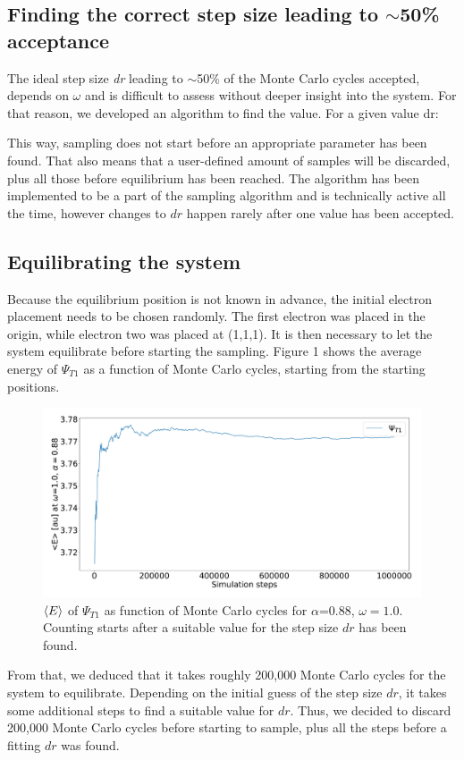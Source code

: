 \documentclass[10pt,a4paper]{article}
\begin{document}
\subsection{Finding the correct step size leading to $\sim$50\% acceptance}
The ideal step size \textit{dr} leading to $\sim$50\% of the Monte Carlo cycles accepted, depends on $\omega$ and is difficult to assess without deeper insight into the system. For that reason, we developed an algorithm to find the value. For a given value dr:\\
\IncMargin{1em}
\begin{algorithm}[H]  
\end{algorithm}
\DecMargin{1em}
This way, sampling does not start before an appropriate parameter has been found. That also means that a user-defined amount of samples will be discarded, plus all those before equilibrium has been reached. The algorithm has been implemented to be a part of the sampling algorithm and is technically active all the time, however changes to $dr$ happen rarely after one value has been accepted. 
\subsection{Equilibrating the system}
Because the equilibrium position is not known in advance, the initial electron placement needs to be chosen randomly. The first electron was placed in the origin, while electron two was placed at (1,1,1). It is then necessary to let the system equilibrate before starting the sampling. Figure 1 shows the average energy of $\Psi_{T1}$ as a function of Monte Carlo cycles, starting from the starting positions.
\begin{figure}[H]
\centering
\includegraphics[width=\textwidth]{Energy_variation.pdf}
\caption[<E> as function of Monte Carlo cycles]{$\braket{E}$ of $\Psi_{T1}$ as function of Monte Carlo cycles for $\alpha$=0.88, $\omega=1.0$. Counting starts after a suitable value for the step size $dr$ has been found.}
\end{figure}
From that, we deduced that it takes roughly 200,000 Monte Carlo cycles for the system to equilibrate. Depending on the initial guess of the step size $dr$, it takes some additional steps to find a suitable value for $dr$. Thus, we decided to discard 200,000 Monte Carlo cycles before starting to sample, plus all the steps before a fitting $dr$ was found.
\end{document}
